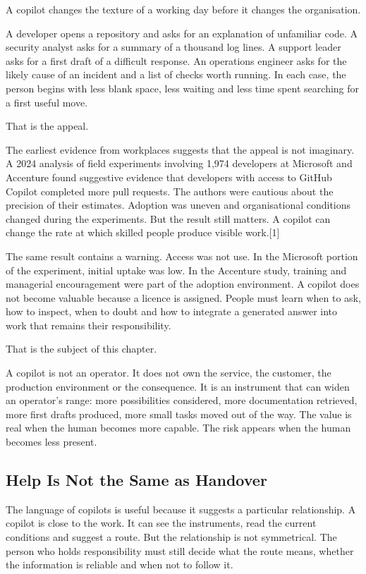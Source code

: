 A copilot changes the texture of a working day before it changes the
organisation.

A developer opens a repository and asks for an explanation of unfamiliar
code. A security analyst asks for a summary of a thousand log lines. A
support leader asks for a first draft of a difficult response. An
operations engineer asks for the likely cause of an incident and a list
of checks worth running. In each case, the person begins with less blank
space, less waiting and less time spent searching for a first useful
move.

That is the appeal.

The earliest evidence from workplaces suggests that the appeal is not
imaginary. A 2024 analysis of field experiments involving 1,974
developers at Microsoft and Accenture found suggestive evidence that
developers with access to GitHub Copilot completed more pull requests.
The authors were cautious about the precision of their estimates.
Adoption was uneven and organisational conditions changed during the
experiments. But the result still matters. A copilot can change the rate
at which skilled people produce visible work.{[}1{]}

The same result contains a warning. Access was not use. In the Microsoft
portion of the experiment, initial uptake was low. In the Accenture
study, training and managerial encouragement were part of the adoption
environment. A copilot does not become valuable because a licence is
assigned. People must learn when to ask, how to inspect, when to doubt
and how to integrate a generated answer into work that remains their
responsibility.

That is the subject of this chapter.

A copilot is not an operator. It does not own the service, the customer,
the production environment or the consequence. It is an instrument that
can widen an operator's range: more possibilities considered, more
documentation retrieved, more first drafts produced, more small tasks
moved out of the way. The value is real when the human becomes more
capable. The risk appears when the human becomes less present.

\subsection{Help Is Not the Same as
Handover}\label{help-is-not-the-same-as-handover}

The language of copilots is useful because it suggests a particular
relationship. A copilot is close to the work. It can see the
instruments, read the current conditions and suggest a route. But the
relationship is not symmetrical. The person who holds responsibility
must still decide what the route means, whether the information is
reliable and when not to follow it.

